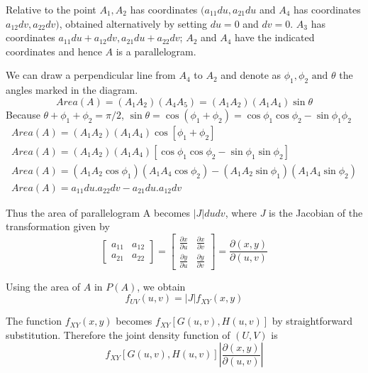 \documentclass{article}
\begin{document}
Relative to the point \(A_1, A_2\) has coordinates \((a_{11}du,a_{21}du\) and \(A_4\) has coordinates \(a_{12}dv,a_{22}dv)\), obtained alternatively by setting \(du=0\) and \(dv=0\). \(A_3\) has coordinates \(a_{11}du+a_{12}dv, a_{21}du+a_{22}dv\); \(A_2\) and \(A_4\) have the indicated coordinates and hence \(A\) is a parallelogram.

We can draw a perpendicular line from \(A_4\) to \(A_2\) and denote as \(\phi_1, \phi_2 \text{ and } \theta\) the angles marked in the diagram.
\begin{equation*}
    Area(A)=(A_1 A_2)(A_4 A_5)=(A_1 A_2) (A_1 A_4) \sin \theta
\end{equation*}
Because \(\theta+\phi_1+\phi_2=\pi/2\), \(\sin\theta=\cos (\phi_1+\phi_2)=\cos \phi_1 \cos \phi_2-\sin \phi_1 \phi_2\)
\begin{equation*}
\begin{split}
    Area (A) = (A_1 A_2) (A_1 A_4) \cos[\phi_1+\phi_2] \\
    Area (A) = (A_1 A_2) (A_1 A_4) [\cos \phi_1 \cos \phi_2-\sin \phi_1 \sin \phi_2] \\
    Area (A) = (A_1 A_2 \cos \phi_1)(A_1 A_4\cos \phi_2)-(A_1 A_2 \sin \phi_1) (A_1 A_4 \sin \phi_2)\\
    Area (A) = a_{11}du .a_{22}dv-a_{21}du. a_{12}dv
\end{split}
\end{equation*}

Thus the area of parallelogram A becomes \(|J|dudv\), where \(J\) is the Jacobian of the transformation given by
\begin{equation*}
\begin{bmatrix}
    a_{11} & a_{12} \\
    a_{21} & a_{22}
\end{bmatrix}
=
\begin{bmatrix}
   \frac{\partial x}{\partial u} & \frac{\partial x}{\partial v} \\
    \frac{\partial y}{\partial u} & \frac{\partial y}{\partial v}  
\end{bmatrix}
= \frac{\partial (x,y)}{\partial(u,v)}
\end{equation*}

Using the area of \(A\) in \(P(A)\), we obtain
\begin{equation*}
    f_{UV}(u,v)=|J| f_{XY}(x,y)
\end{equation*}

The function \(f_{XY}(x,y)\) becomes \(f_{XY}[G(u,v),H(u,v)]\) by straightforward substitution. Therefore the joint density function of \((U,V)\) is 
\begin{equation*}
   f_{XY}[G(u,v),H(u,v)] \left|\frac{\partial (x,y)}{\partial (u,v)} \right|
\end{equation*}
\end{document}
